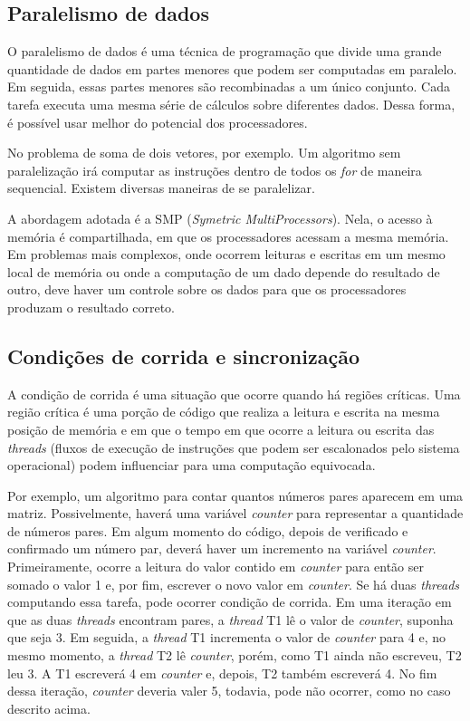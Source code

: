 \documentclass[12pt]{article}
\begin{document}
\subsection{Paralelismo de dados}

O paralelismo de dados é uma técnica de programação que divide uma grande quantidade de dados em partes menores que podem ser computadas em paralelo. Em seguida, essas partes menores são recombinadas a um único conjunto. Cada tarefa executa uma mesma série de cálculos sobre diferentes dados. Dessa forma, é possível usar melhor do potencial dos processadores.

No problema de soma de dois vetores, por exemplo. Um algoritmo sem paralelização irá computar as instruções dentro de todos os \textit{for} de maneira sequencial. Existem diversas maneiras de se paralelizar. 

A abordagem adotada é a SMP (\textit{Symetric MultiProcessors}). Nela, o acesso à memória é compartilhada, em que os processadores acessam a mesma memória. Em problemas mais complexos, onde ocorrem leituras e escritas em um mesmo local de memória ou onde a computação de um dado depende do resultado de outro, deve haver um controle sobre os dados para que os processadores produzam o resultado correto.

\subsection{Condições de corrida e sincronização}

A condição de corrida é uma situação que ocorre quando há regiões críticas. Uma região crítica é uma porção de código que realiza a leitura e escrita na mesma posição de memória e em que o tempo em que ocorre a leitura ou escrita das \textit{threads} (fluxos de execução de instruções que podem ser escalonados pelo sistema operacional) podem influenciar para uma computação equivocada. 

Por exemplo, um algoritmo para contar quantos números pares aparecem em uma matriz. Possivelmente, haverá uma variável \textit{counter} para representar a quantidade de números pares. Em algum momento do código, depois de verificado e confirmado um número par, deverá haver um incremento na variável \textit{counter}. Primeiramente, ocorre a leitura do valor contido em \textit{counter} para então ser somado o valor 1 e, por fim, escrever o novo valor em \textit{counter}. Se há duas \textit{threads} computando essa tarefa, pode ocorrer condição de corrida. Em uma iteração em que as duas \textit{threads} encontram pares, a \textit{thread} T1 lê o valor de \textit{counter}, suponha que seja 3. Em seguida, a \textit{thread} T1 incrementa o valor de \textit{counter} para 4 e, no mesmo momento, a \textit{thread} T2 lê \textit{counter}, porém, como T1 ainda não escreveu, T2 leu 3. A T1 escreverá 4 em \textit{counter} e, depois, T2 também escreverá 4. No fim dessa iteração, \textit{counter} deveria valer 5, todavia, pode não ocorrer, como no caso descrito acima.
\end{document}
